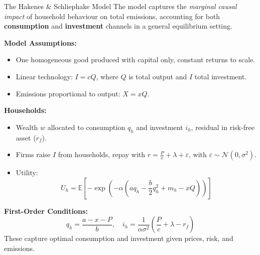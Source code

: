 \documentclass{beamer}
\begin{document}
\begin{frame}{The Hakenes \& Schliephake Model}
\footnotesize
\vspace{-2.5em}
The model captures the \textit{marginal causal impact} of household behaviour on total emissions, accounting for both \textbf{consumption} and \textbf{investment} channels in a general equilibrium setting.

\vspace{0.4em}
\textbf{Model Assumptions:}
\begin{itemize}
  \item One homogeneous good produced with capital only, constant returns to scale.
  \item Linear technology: \( I = c Q \), where \(Q\) is total output and \(I\) total investment.
  \item Emissions proportional to output: \( X = x Q \).
\end{itemize}

\textbf{Households:}
\begin{itemize}
  \item Wealth \(w\) allocated to consumption \(q_h\) and investment \(i_h\), residual in risk-free asset (\(r_f\)).
  \item Firms raise \(I\) from households, repay with \(r = \frac{P}{c} + \lambda + \varepsilon\), with \(\varepsilon \sim \mathcal{N}(0,\sigma^2)\).
  \item Utility:  
  \[
  U_h = \mathbb{E}\left[-\exp\left(-\alpha \left( a q_h - \frac{b}{2}q_h^2 + m_h - xQ \right)\right)\right]
  \]
\end{itemize}

\textbf{First-Order Conditions:}
\[
q_h = \frac{a - x - P}{b}, \quad 
i_h = \frac{1}{\alpha\sigma^2}\left(\frac{P}{c} + \lambda - r_f\right)
\]
These capture optimal consumption and investment given prices, risk, and emissions.
\end{frame}
\end{document}
